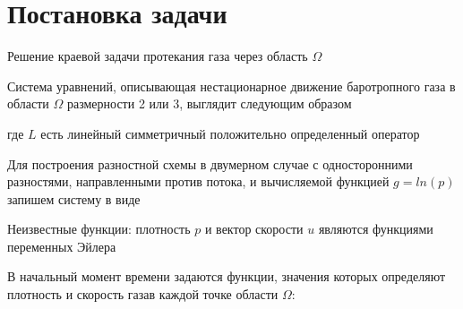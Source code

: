 
\section{\LARGE Постановка задачи}
Решение краевой задачи протекания газа через область $\Omega$

Система уравнений, описывающая нестационарное движение баротропного газа в области $\Omega$ размерности 2 или 3, выглядит следующим образом

\begin{figure}[h]
\end{figure}
где $L$ есть линейный симметричный положительно определенный оператор
\begin{figure}[h!]
\end{figure}

Для построения разностной схемы в двумерном случае с односторонними разностями, направленными против потока, и вычисляемой функцией $g = ln(p)$ запишем систему в виде
\begin{figure}[h!]
\end{figure}
\newpage
Неизвестные функции: плотность $p$ и вектор скорости $u$ являются функциями переменных Эйлера
\begin{figure}[h!] 
\end{figure}

В начальный момент времени задаются функции, значения которых определяют плотность и скорость газав каждой точке области $\Omega$:
\begin{figure}[h]
\end{figure}

